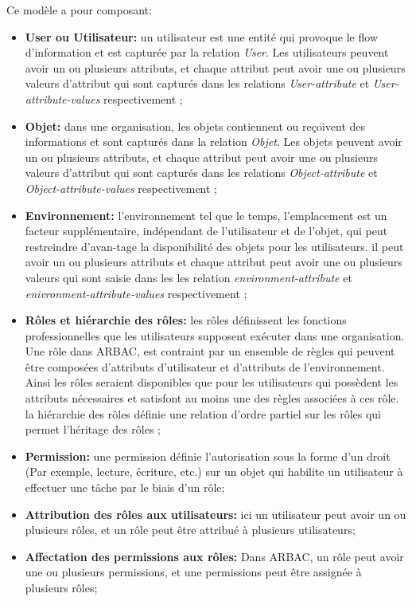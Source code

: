 Ce modèle a pour composant:
\begin{itemize}
\item \textbf{User ou Utilisateur:} un utilisateur est une entité qui provoque le flow d'information et est capturée par la relation \textit{User}. Les utilisateurs peuvent avoir un ou plusieurs attributs, et chaque attribut peut avoir une ou plusieurs valeurs d'attribut qui sont capturés dans les relations \textit{User-attribute} et \textit{User-attribute-values} respectivement \cite{singh19};
\item \textbf{Objet:} dans une organisation, les objets contiennent ou reçoivent des informations et sont capturés dans la relation \textit{Objet}. Les objets peuvent avoir un ou plusieurs attributs, et chaque attribut peut avoir une ou plusieurs valeurs d'attribut qui sont capturés dans les relations \textit{Object-attribute} et \textit{Object-attribute-values} respectivement \cite{singh19};
\item \textbf{Environnement:} l'environnement tel que le temps, l'emplacement est un facteur supplémentaire, indépendant de l'utilisateur et de l'objet, qui peut restreindre d'avan-tage la disponibilité des objets pour les utilisateurs. il peut avoir un ou plusieurs attributs et chaque attribut peut avoir une ou plusieurs valeurs qui sont saisie dans les les relation \textit{environment-attribute} et \textit{enivronment-attribute-values} respectivement \cite{singh19};
\item \textbf{Rôles et hiérarchie des rôles:} les rôles définissent les fonctions professionnelles que les utilisateurs supposent exécuter dans une organisation. Une rôle dans ARBAC, est contraint par un ensemble de règles qui peuvent être composées d'attributs d'utilisateur et d'attributs de l'environnement. Ainsi les rôles seraient disponibles que pour les utilisateurs qui possèdent les attributs nécessaires et satisfont au moins une des règles associées à ces rôle. la hiérarchie des rôles définie une relation d'ordre partiel sur les rôles qui permet l'héritage des rôles \cite{singh19};
\item \textbf{Permission:} une permission définie l'autorisation sous la forme d'un droit (Par exemple, lecture, écriture, etc.) sur un objet qui habilite un utilisateur à effectuer une tâche par le biais d'un rôle;
\item \textbf{Attribution des rôles aux utilisateurs:} ici un utilisateur peut avoir un ou plusieurs rôles, et un rôle peut être attribué à plusieurs utilisateurs;
\item \textbf{Affectation des permissions aux rôles:} Dans ARBAC, un rôle peut avoir une ou plusieurs permissions, et une permissions peut être assignée à plusieurs rôles;

\end{itemize}
